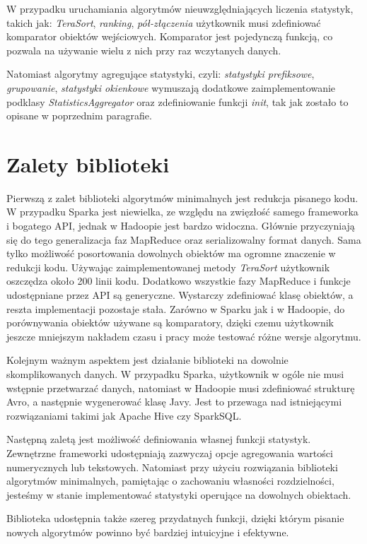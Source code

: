 \documentclass[licencjacka]{pracamgr}
\begin{document}
W przypadku uruchamiania algorytmów nieuwzględniających liczenia statystyk, takich jak: \textit{TeraSort}, \textit{ranking}, \textit{pół-złączenia} użytkownik musi zdefiniować komparator obiektów wejściowych. Komparator jest pojedynczą funkcją, co pozwala na używanie wielu z nich przy raz wczytanych danych.

Natomiast algorytmy agregujące statystyki, czyli: \textit{statystyki prefiksowe}, \textit{grupowanie}, \textit{statystyki okienkowe} wymuszają dodatkowe zaimplementowanie podklasy \textit{StatisticsAggregator} oraz zdefiniowanie funkcji \textit{init}, tak jak zostało to opisane w poprzednim paragrafie.

\chapter{Zalety biblioteki}

Pierwszą z zalet biblioteki algorytmów minimalnych jest redukcja pisanego kodu. W przypadku Sparka jest niewielka, ze względu na zwięzłość samego frameworka i bogatego API, jednak w Hadoopie jest bardzo widoczna. Głównie przyczyniają się do tego generalizacja faz MapReduce oraz serializowalny format danych. Sama tylko możliwość posortowania dowolnych obiektów ma ogromne znaczenie w redukcji kodu. Używając zaimplementowanej metody \textit{TeraSort} użytkownik oszczędza około 200 linii kodu. Dodatkowo wszystkie fazy MapReduce i funkcje udostępniane przez API są generyczne. Wystarczy zdefiniować klasę obiektów, a reszta implementacji pozostaje stała. Zarówno w Sparku jak i w Hadoopie, do porównywania obiektów używane są komparatory, dzięki czemu użytkownik jeszcze mniejszym nakładem czasu i pracy może testować różne wersje algorytmu.

Kolejnym ważnym aspektem jest działanie biblioteki na dowolnie skomplikowanych danych. W przypadku Sparka, użytkownik w ogóle nie musi wstępnie przetwarzać danych, natomiast w Hadoopie musi zdefiniować strukturę Avro, a następnie wygenerować klasę Javy. Jest to przewaga nad istniejącymi rozwiązaniami takimi jak Apache Hive czy SparkSQL.

Następną zaletą jest możliwość definiowania własnej funkcji statystyk. Zewnętrzne frameworki udostępniają zazwyczaj opcje agregowania wartości numerycznych lub tekstowych. Natomiast przy użyciu rozwiązania biblioteki algorytmów minimalnych, pamiętając o zachowaniu własności rozdzielności, jesteśmy w stanie implementować statystyki operujące na dowolnych obiektach.

Biblioteka udostępnia także szereg przydatnych funkcji, dzięki którym pisanie nowych algorytmów powinno być bardziej intuicyjne i efektywne.
\end{document}
